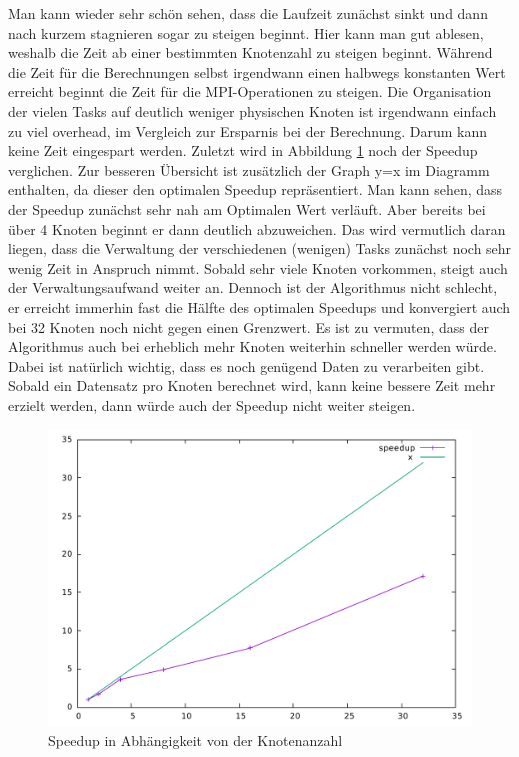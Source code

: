 \documentclass[
	12pt,			%
	a4paper,		%
	twoside,		%
	german,			%
	headsepline,		%
	footnosepline=true,		%
	automark,		%
	smallheadings,		%
	appendixprefix,		%
	openright,		%
	cleardoubleempty,	%
	abstracton,		%
	index=totoc,		%
	listof=totoc,		%
	bibliography=totoc,		%
 	BCOR8mm,		%
]{scrreprt}
\begin{document}
Man kann wieder sehr schön sehen, dass die Laufzeit zunächst sinkt und dann nach kurzem stagnieren sogar zu steigen beginnt. Hier kann man gut ablesen, weshalb die Zeit ab einer bestimmten Knotenzahl zu steigen beginnt. Während die Zeit für die Berechnungen selbst irgendwann einen halbwegs konstanten Wert erreicht beginnt die Zeit für die MPI-Operationen zu steigen. Die Organisation der vielen Tasks auf deutlich weniger physischen Knoten ist irgendwann einfach zu viel overhead, im Vergleich zur Ersparnis bei der Berechnung. Darum kann keine Zeit eingespart werden. Zuletzt wird in Abbildung \ref{fig:speedup} noch der Speedup verglichen. Zur besseren Übersicht ist zusätzlich der Graph y=x im Diagramm enthalten, da dieser den optimalen Speedup repräsentiert. Man kann sehen, dass der Speedup zunächst sehr nah am Optimalen Wert verläuft. Aber bereits bei über 4 Knoten beginnt er dann deutlich abzuweichen. Das wird vermutlich daran liegen, dass die Verwaltung der verschiedenen (wenigen) Tasks zunächst noch sehr wenig Zeit in Anspruch nimmt. Sobald sehr viele Knoten vorkommen, steigt auch der Verwaltungsaufwand weiter an. Dennoch ist der Algorithmus nicht schlecht, er erreicht immerhin fast die Hälfte des optimalen Speedups und konvergiert auch bei 32 Knoten noch nicht gegen einen Grenzwert. Es ist zu vermuten, dass der Algorithmus auch bei erheblich mehr Knoten weiterhin schneller werden würde. Dabei ist natürlich wichtig, dass es noch genügend Daten zu verarbeiten gibt. Sobald ein Datensatz pro Knoten berechnet wird, kann keine bessere Zeit mehr erzielt werden, dann würde auch der Speedup nicht weiter steigen.
\begin{figure}[htbp]
\begin{center}
\caption{Speedup in Abhängigkeit von der Knotenanzahl}
\label{fig:speedup}
\includegraphics[width=\textwidth]{speedup}
\end{center}
\end{figure}
	
\end{document}

